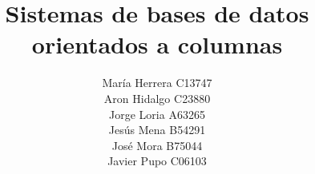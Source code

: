 \documentclass[stu,12pt,spanish]{apa7}
\title{Sistemas de bases de datos orientados a columnas}
\author{María Herrera C13747 \\ Aron Hidalgo C23880 \\ Jorge Loria A63265 \\ Jesús Mena B54291 \\ José Mora B75044 \\ Javier Pupo C06103}
\begin{document}
\maketitle

\renewcommand{\contentsname}{Tabla de contenidos}
\tableofcontents
\newpage








\newpage
\nocite{*}
\printbibliography[heading=bibintoc]
\end{document}
